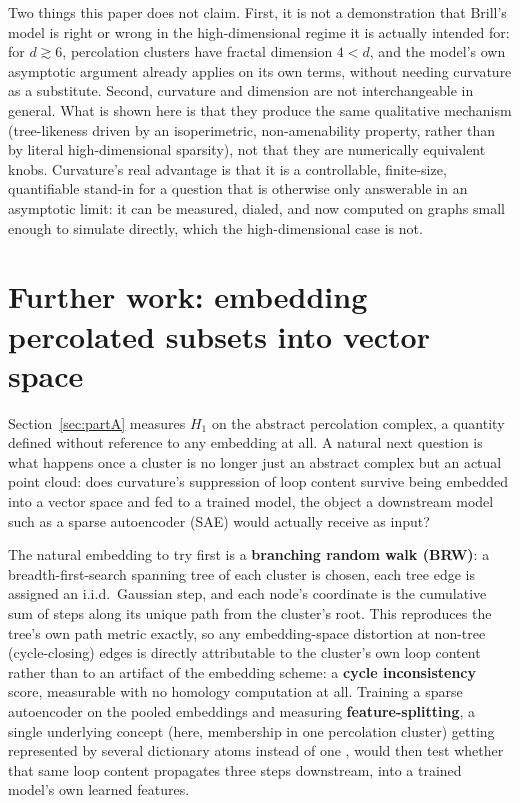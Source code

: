 \documentclass[11pt]{article}
\begin{document}
Two things this paper does not claim. First, it is not a demonstration that Brill's model is right or wrong in the high-dimensional regime it is actually intended for: for $d\gtrsim6$, percolation clusters have fractal dimension $4<d$, and the model's own asymptotic argument already applies on its own terms, without needing curvature as a substitute. Second, curvature and dimension are not interchangeable in general. What is shown here is that they produce the same qualitative mechanism (tree-likeness driven by an isoperimetric, non-amenability property, rather than by literal high-dimensional sparsity), not that they are numerically equivalent knobs. Curvature's real advantage is that it is a controllable, finite-size, quantifiable stand-in for a question that is otherwise only answerable in an asymptotic limit: it can be measured, dialed, and now computed on graphs small enough to simulate directly, which the high-dimensional case is not.

\section{Further work: embedding percolated subsets into vector space}
\label{sec:partB}

Section~\ref{sec:partA} measures $H_1$ on the abstract percolation complex, a quantity defined without reference to any embedding at all. A natural next question is what happens once a cluster is no longer just an abstract complex but an actual point cloud: does curvature's suppression of loop content survive being embedded into a vector space and fed to a trained model, the object a downstream model such as a sparse autoencoder (SAE) would actually receive as input?

The natural embedding to try first is a \textbf{branching random walk (BRW)}: a breadth-first-search spanning tree of each cluster is chosen, each tree edge is assigned an i.i.d.\ Gaussian step, and each node's coordinate is the cumulative sum of steps along its unique path from the cluster's root. This reproduces the tree's own path metric exactly, so any embedding-space distortion at non-tree (cycle-closing) edges is directly attributable to the cluster's own loop content rather than to an artifact of the embedding scheme: a \textbf{cycle inconsistency} score, measurable with no homology computation at all. Training a sparse autoencoder on the pooled embeddings and measuring \textbf{feature-splitting}, a single underlying concept (here, membership in one percolation cluster) getting represented by several dictionary atoms instead of one \citep{bricken2023,cunningham2023}, would then test whether that same loop content propagates three steps downstream, into a trained model's own learned features.
\end{document}

